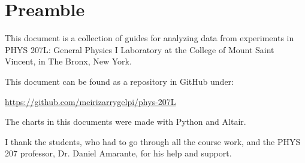 \chapter*{Preamble}
This document is a collection of guides for analyzing data from experiments in PHYS 207L: General Physics I Laboratory at the College of Mount Saint Vincent, in The Bronx, New York.

This document can be found as a repository in GitHub under:
\begin{center}
    \url{https://github.com/meirizarrygelpi/phys-207L}
\end{center}
The charts in this documents were made with Python and Altair.

I thank the students, who had to go through all the course work, and the PHYS 207 professor, Dr. Daniel Amarante, for his help and support.